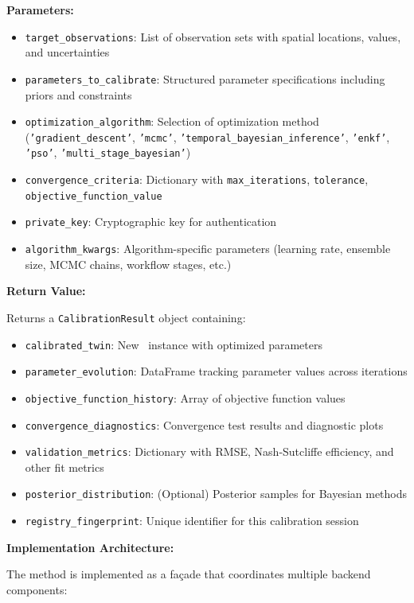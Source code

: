 \textbf{Parameters:}

\begin{itemize}
    \item \texttt{target\_observations}: List of observation sets with spatial locations, values, and uncertainties
    \item \texttt{parameters\_to\_calibrate}: Structured parameter specifications including priors and constraints
    \item \texttt{optimization\_algorithm}: Selection of optimization method (\texttt{'gradient\_descent'}, \texttt{'mcmc'}, \texttt{'temporal\_bayesian\_inference'}, \texttt{'enkf'}, \texttt{'pso'}, \texttt{'multi\_stage\_bayesian'})
    \item \texttt{convergence\_criteria}: Dictionary with \texttt{max\_iterations}, \texttt{tolerance}, \texttt{objective\_function\_value}
    \item \texttt{private\_key}: Cryptographic key for authentication
    \item \texttt{algorithm\_kwargs}: Algorithm-specific parameters (learning rate, ensemble size, MCMC chains, workflow stages, etc.)
\end{itemize}

\textbf{Return Value:}

Returns a \texttt{CalibrationResult} object containing:
\begin{itemize}
    \item \texttt{calibrated\_twin}: New \hydrot\ instance with optimized parameters
    \item \texttt{parameter\_evolution}: DataFrame tracking parameter values across iterations
    \item \texttt{objective\_function\_history}: Array of objective function values
    \item \texttt{convergence\_diagnostics}: Convergence test results and diagnostic plots
    \item \texttt{validation\_metrics}: Dictionary with RMSE, Nash-Sutcliffe efficiency, and other fit metrics
    \item \texttt{posterior\_distribution}: (Optional) Posterior samples for Bayesian methods
    \item \texttt{registry\_fingerprint}: Unique identifier for this calibration session
\end{itemize}

\textbf{Implementation Architecture:}

The method is implemented as a façade that coordinates multiple backend components:

